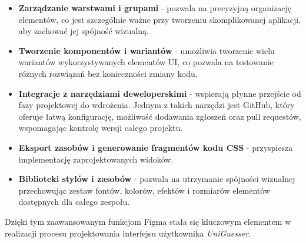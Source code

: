 \begin{itemize}
    \item \textbf{Zarządzanie warstwami i grupami} - pozwala na precyzyjną organizację elementów, co jest szczególnie ważne przy tworzeniu skomplikowanej aplikacji, aby zachować jej spójność wizualną.
    \item \textbf{Tworzenie komponentów i wariantów} - umożliwia tworzenie wielu wariantów wykorzystywanych elementów UI, co pozwala na testowanie różnych rozwiązań bez konieczności zmiany kodu.
    \item \textbf{Integracje z narzędziami deweloperskimi} - wspierają płynne przejście od fazy projektowej do wdrożenia. Jednym z takich narzędzi jest GitHub, który oferuje łatwą konfigurację, możliwość dodawania zgłoszeń oraz pull requestów, wspomagając kontrolę wersji całego projektu.
    \item \textbf{Eksport zasobów i generowanie fragmentów kodu CSS} - przyspiesza implementację zaprojektowanych widoków.
    \item \textbf{Biblioteki stylów i zasobów} - pozwala na utrzymanie spójności wizualnej przechowując zestaw fontów, kolorów, efektów i rozmiarów elementów dostępnych dla całego zespołu.
\end{itemize}

Dzięki tym zaawansowanym funkcjom Figma stała się kluczowym elementem w realizacji procesu projektowania interfejsu użytkownika \textit{UniGuesser}.